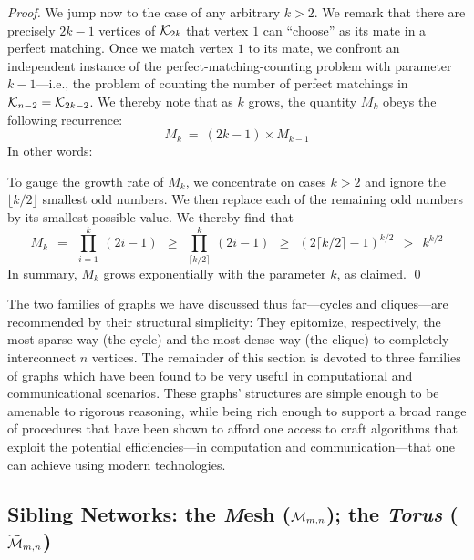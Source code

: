 \begin{proof}
\medskip

We jump now to the case of any arbitrary $k > 2$.  We remark that there are precisely $2k-1$ vertices of $\mbox{$\cal K$}_{2k}$ that vertex $1$ can ``choose'' as its mate in a perfect matching.  Once we match vertex $1$ to its mate, we confront an independent instance of the perfect-matching-counting problem with parameter $k-1$---i.e., the problem of counting the number of perfect matchings in $\mbox{$\cal K$}_{n-2} = \mbox{$\cal K$}_{2k-2}$.  We thereby note that as $k$ grows, the quantity $M_k$ obeys the following recurrence:
\[ M_k \ = \ (2k-1) \times M_{k-1} \]
In other words:

\smallskip

\hspace*{.25in}{\em $M_k$ is the product of the first $k$ odd numbers.}

\smallskip

\noindent
To gauge the growth rate of $M_k$, we concentrate on cases $k > 2$ and ignore the $\lfloor k/2 \rfloor$ smallest odd numbers.  We then replace each of the remaining odd numbers by its smallest possible value.  We thereby find that
\[
M_k \ \ =    \ \ \prod_{i=1}^k \ (2i-1)
    \ \ \geq \ \ \prod_{\lceil k/2 \rceil}^k \ (2i-1)
    \ \ \geq \ \ \left( 2 \lceil k/2 \rceil -1 \right)^{k/2}
    \ \ >    \ \ k^{k/2}
\]
In summary, $M_k$ grows exponentially with the parameter $k$, as claimed.  \qed
\end{proof}

\bigskip

The two families of graphs we have discussed thus far---cycles and cliques---are recommended by their structural simplicity:  They epitomize, respectively, the most sparse way (the cycle) and the most dense way (the clique) to completely interconnect $n$ vertices.  The remainder of this section is devoted to three families of graphs which have been found to be very useful in computational and communicational scenarios.  These graphs' structures are simple enough to be amenable to rigorous reasoning, while being rich enough to support a broad range of procedures that have been shown to afford one access to craft algorithms that exploit the potential efficiencies---in computation and communication---that one can achieve using modern technologies.

\subsection{Sibling Networks: the {\it M}esh ($\mbox{$\cal M$}_{m,n}$); the {\it Torus} ($\widetilde{\mbox{$\cal M$}}_{m,n}$)}
\label{sec:mesh}

